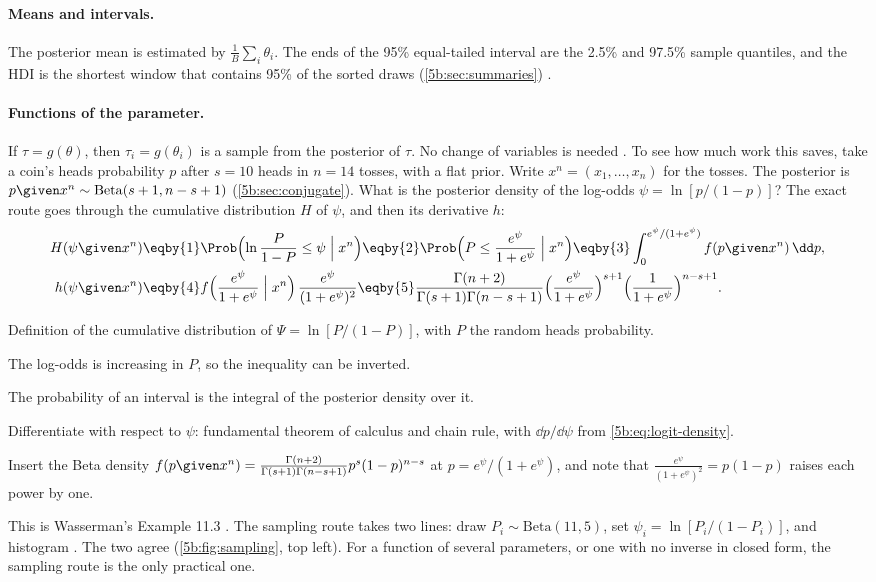\paragraph{Means and intervals.} The posterior mean is estimated by $\frac1B\sum_i
\theta_i$. The ends of the 95\% equal-tailed interval are the 2.5\% and 97.5\% sample
quantiles, and the HDI is the shortest window that contains 95\% of the sorted draws
(\cref{5b:sec:summaries}) .

\paragraph{Functions of the parameter.} If $\tau=g(\theta)$, then $\tau_i=g(\theta_i)$ is
a sample from the posterior of $\tau$. No change of variables is needed
. To see how much work this saves, take a coin's heads probability
$p$ after $s=10$ heads in $n=14$ tosses, with a flat prior. Write $x^n=(x_1,\dots,x_n)$
for the tosses. The posterior is $p\given x^n\sim\mathrm{Beta}(s+1,n-s+1)$
(\cref{5b:sec:conjugate}). What is the posterior density of the log-odds
$\psi=\ln[p/(1-p)]$? The exact route goes through the cumulative distribution $H$ of
$\psi$, and then its derivative $h$:
\begin{align*}
  H(\psi\given x^n)
  &\eqby{1}\Prob\Bigl(\ln\frac{P}{1-P}\le\psi\Bigm| x^n\Bigr)
   \eqby{2}\Prob\Bigl(P\le\frac{e^\psi}{1+e^\psi}\Bigm| x^n\Bigr)
   \eqby{3}\int_0^{e^\psi/(1+e^\psi)}f(p\given x^n)\,\dd p,\\
  h(\psi\given x^n)
  &\eqby{4}f\Bigl(\frac{e^\psi}{1+e^\psi}\Bigm| x^n\Bigr)\,\frac{e^\psi}{(1+e^\psi)^2}
   \eqby{5}\frac{\Gamma(n+2)}{\Gamma(s+1)\Gamma(n-s+1)}
     \Bigl(\frac{e^\psi}{1+e^\psi}\Bigr)^{s+1}\Bigl(\frac{1}{1+e^\psi}\Bigr)^{n-s+1}.
\end{align*}
\begin{explain}
  \item Definition of the cumulative distribution of $\Psi=\ln[P/(1-P)]$, with $P$ the
        random heads probability.
  \item The log-odds is increasing in $P$, so the inequality can be inverted.
  \item The probability of an interval is the integral of the posterior density over it.
  \item Differentiate with respect to $\psi$: fundamental theorem of calculus and chain
        rule, with $\dd p/\dd\psi$ from \eqref{5b:eq:logit-density}.
  \item Insert the Beta density $f(p\given x^n)=\frac{\Gamma(n+2)}{\Gamma(s+1)\Gamma(n-s+1)}
        p^s(1-p)^{n-s}$ at $p=e^\psi/(1+e^\psi)$, and note that $\frac{e^\psi}{(1+e^\psi)^2}
        =p(1-p)$ raises each power by one.
\end{explain}
This is Wasserman's Example 11.3 . The sampling route takes two lines:
draw $P_i\sim\mathrm{Beta}(11,5)$, set $\psi_i=\ln[P_i/(1-P_i)]$, and histogram
. The two agree (\cref{5b:fig:sampling}, top left). For a
function of several parameters, or one with no inverse in closed form, the sampling
route is the only practical one.


